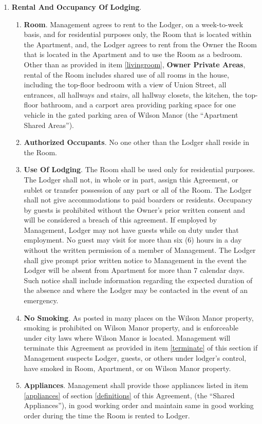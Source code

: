 \documentclass[12pt,letterpaper]{article}
\newcommand{\lodger}{Lodger}
\newcommand{\management}{Management}
\newcommand{\condo}{Wilson Manor}
\newcommand{\apt}{Apartment}
\newcommand{\room}{Room}
\newcommand{\shared}{Apartment Shared Areas}
\newcommand{\livingroom}{Owner Private Areas}
\newcommand{\appliances}{Shared Appliances}
\begin{document}
	\begin{enumerate}
		\item \textbf{Rental And Occupancy Of Lodging}. 
			\begin{enumerate}
				\item \textbf{Room}.
					\management{} agrees to rent to the \lodger{}, on a week-to-week basis, and for residential purposes only, the \room{} that is located within the \apt{}, and, the \lodger{} agrees to rent from the Owner the \room{} that is located in the \apt{} and to use the \room{} as a bedroom.  Other than as provided in item \ref{livingroom}, \textbf{\livingroom{}}, rental of the \room{} includes shared use of all rooms in the house, including the top-floor bedroom with a view of Union Street, all entrances, all hallways and stairs, all hallway closets, the kitchen, the top-floor bathroom, and a carport area providing parking space for one vehicle in the gated parking area of \condo{} (the ``\shared{}'').
				\item \textbf{Authorized Occupants}. No one other than the \lodger{} shall reside in the \room{}. 
				\item \textbf{Use Of Lodging}. The \room{} shall be used only for residential purposes. The \lodger{} shall not, in whole or in part, assign this Agreement, or sublet or transfer possession of any part or all of the \room{}. The \lodger{} shall not give accommodations to paid boarders or residents. Occupancy by guests is prohibited without the Owner's prior written consent and will be considered a breach of this agreement. If employed by \management{}, \lodger{} may not have guests while on duty under that employment. No guest may visit for more than six (6) hours in a day without the written permission of a member of \management{}. The \lodger{} shall give prompt prior written notice to \management{} in the event the \lodger{} will be absent from \apt{} for more than 7 calendar days. Such notice shall include information regarding the expected duration of the absence and where the \lodger{} may be contacted in the event of an emergency. 
				\item \textbf{No Smoking}. As posted in many places on the \condo{} property, smoking is prohibited on \condo{} property, and is enforceable under city laws where \condo{} is located. \management{} will terminate this Agreement as provided in item \ref{terminate} of this section if \management{} suspects \lodger{}, guests, or others under lodger's control, have smoked in \room{}, \apt{}, or on \condo{} property.
				\item \textbf{Appliances}. \management{} shall provide those appliances listed in item \ref{appliances} of section \ref{definitions} of this Agreement{}, (the ``\appliances{}''), in good working order and maintain same in good working order during the time the \room{} is rented to \lodger{}.

\end{enumerate}
\end{enumerate}
\end{document}
